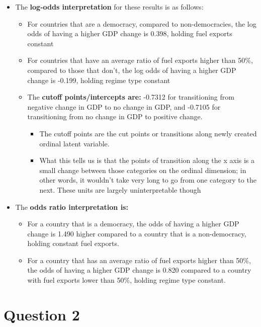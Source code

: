 \documentclass[12pt,letterpaper]{article}
\begin{document}
\begin{enumerate}
\begin{itemize}
	\item The \textbf{log-odds interpretation} for these results is as follows:
		\begin{itemize}
			\item  For countries that are a democracy, compared to non-democracies, the log odds of having a higher GDP change is 0.398, holding fuel exports constant
			\item For countries that have an average ratio of fuel exports higher than 50\%, compared to those that don't, the log odds of having a higher GDP change is -0.199, holding regime type constant
			\item The \textbf{cutoff points/intercepts are:} -0.7312 for transitioning from negative change in GDP to no change in GDP, and -0.7105 for transitioning from no change in GDP to positive change.
				\begin{itemize}
					\item The cutoff points are the cut points or transitions along newly created ordinal latent variable.
					\item What this tells us is that the points of transition along the x axis is a small change between those categories on the ordinal dimension; in other words, it wouldn’t take very long to go from one category to the next. These units are largely uninterpretable though
					
				\end{itemize}
		\end{itemize}
		
		\item The \textbf{odds ratio interpretation is:} 
			\begin{itemize}
				\item For a country that is a democracy, the odds of having a higher GDP change is 1.490
				higher compared to a country that is a non-democracy, holding constant fuel exports.
				\item For a country that has an average ratio of fuel exports higher than 50\%, the odds of having a higher GDP change is 0.820 compared to a country with fuel exports lower than 50\%, holding regime type constant.
			\end{itemize}
		
		
	\end{itemize}
\end{enumerate}

\section*{Question 2} 
\vspace{.25cm}
\end{document}
